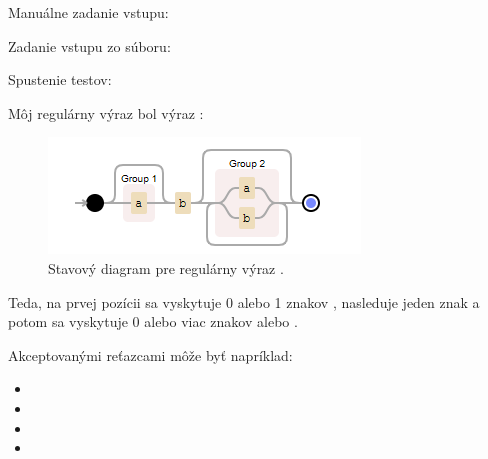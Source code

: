 \documentclass[12pt,a4paper]{article}
\begin{document}
    \noindentfix Manuálne zadanie vstupu:

    \noindentfix {}

    \noindentfix Zadanie vstupu zo súboru:

    \noindentfix {}

    \noindentfix Spustenie testov:

    \noindentfix {}
    \pagebreak


    \noindentfix Môj regulárny výraz bol výraz :
    \begin{figure}[h]
        \centering
        \includegraphics{./assets/stavovy-diagram-pre-regularny-vyraz.png}
        \caption{Stavový diagram pre regulárny výraz .}
        \label{fig:stavovy-diagram}
    \end{figure}

    \noindentfix Teda, na prvej pozícii sa vyskytuje 0 alebo 1 znakov , nasleduje jeden znak  a potom sa vyskytuje 0 alebo viac znakov  alebo .

    \noindentfix Akceptovanými reťazcami môže byť napríklad:
    \begin{itemize}
        \setlength{\parskip}{0pt}
        \setlength{\itemsep}{0pt}
        \item {}
        \item {}
        \item {}
        \item {}
    \end{itemize}
\end{document}
